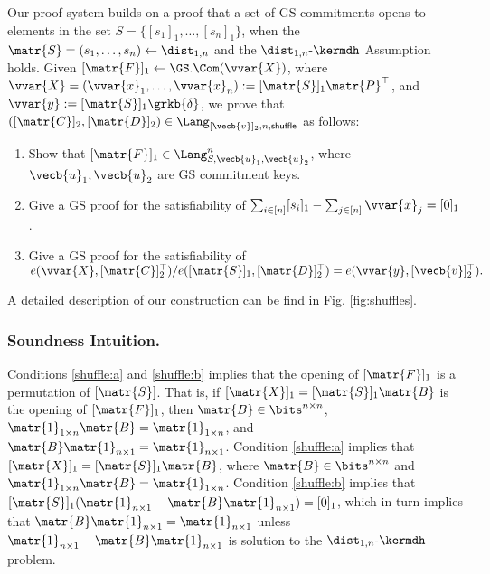 Our proof system builds on a proof that a set of GS commitments opens to elements in the set $S=\{[s_1]_1,\ldots,[s_n]_1\}$, when the $\matr{S}=(s_1,\ldots,s_n)\gets\dist_{1,n}$ and the $\dist_{1,n}\mbox{-}\kermdh$ Assumption holds. Given $[\matr{F}]_1\gets\GS.\Com(\vvar{X})$, where $\vvar{X}=(\vvar{x}_1,\ldots,\vvar{x}_n):=[\matr{S}]_1\matr{P}^\top$, and $\vvar{y}:=[\matr{S}]_1\grkb{\delta}$, we prove that $([\matr{C}]_2,[\matr{D}]_2)\in\Lang_{[\vecb{v}]_2,n,\mathsf{shuffle}}$ as follows:
\begin{enumerate}[label=\alph*)]
\item Show that $[\matr{F}]_1\in\Lang_{S,\vecb{u}_1,\vecb{u}_2}^n$, where $\vecb{u}_1,\vecb{u}_2$ are GS commitment keys.\label{shuffle:a}
\item Give a GS proof for the satisfiability of $\sum_{i\in[n]}[s_i]_1-\sum_{j\in[n]}\vvar{x}_j=[0]_1$.\label{shuffle:b}
\item Give a GS proof for the satisfiability of
$
e(\vvar{X},[\matr{C}]_2^\top)/e([\matr{S}]_1,[\matr{D}]_2^\top)=e(\vvar{y},[\vecb{v}]^\top_2).\label{shuffle:c}
$
\end{enumerate}

A detailed description of our construction can be find in Fig. \ref{fig:shuffles}.

\subsubsection{Soundness Intuition.} Conditions \ref{shuffle:a} and \ref{shuffle:b} implies that the opening of $[\matr{F}]_1$ is a permutation of $[\matr{S}]$. That is, if $[\matr{X}]_1=[\matr{S}]_1\matr{B}$ is the opening of $[\matr{F}]_1$, then $\matr{B}\in\bits^{n\times n}$, $\matr{1}_{1\times n}\matr{B}=\matr{1}_{1\times n}$, and $\matr{B}\matr{1}_{n\times 1}=\matr{1}_{n\times 1}$. Condition \ref{shuffle:a} implies that $[\matr{X}]_1=[\matr{S}]_1\matr{B}$, where $\matr{B}\in\bits^{n\times n}$ and $\matr{1}_{1\times n}\matr{B}=\matr{1}_{1\times n}$. Condition \ref{shuffle:b} implies that $[\matr{S}]_1(\matr{1}_{n\times 1}-\matr{B}\matr{1}_{n\times 1})=[0]_1$, which in turn implies that $\matr{B}\matr{1}_{n\times 1}=\matr{1}_{n\times 1}$ unless $\matr{1}_{n\times 1}-\matr{B}\matr{1}_{n\times 1}$ is solution to the $\dist_{1,n}\mbox{-}\kermdh$ problem.

